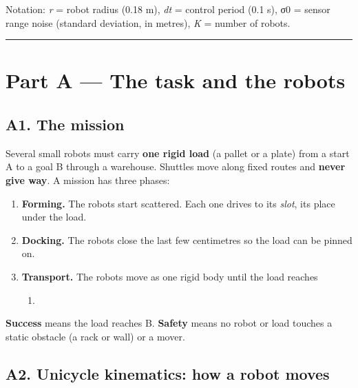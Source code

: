 \documentclass[
  10.5pt,
  a4paper,
]{article}
\providecommand{\tightlist}{%
  \setlength{\itemsep}{0pt}\setlength{\parskip}{0pt}}
\begin{document}
Notation: \emph{r} = robot radius (0.18 m), \emph{dt} = control period
(0.1 s), σ0 = sensor range noise (standard deviation, in metres),
\emph{K} = number of robots.

\begin{center}\rule{0.5\linewidth}{0.5pt}\end{center}

\hypertarget{part-a-the-task-and-the-robots}{%
\section{Part A --- The task and the
robots}\label{part-a-the-task-and-the-robots}}

\hypertarget{a1.-the-mission}{%
\subsection{A1. The mission}\label{a1.-the-mission}}

Several small robots must carry \textbf{one rigid load} (a pallet or a
plate) from a start A to a goal B through a warehouse. Shuttles move
along fixed routes and \textbf{never give way}. A mission has three
phases:

\begin{enumerate}
\def\labelenumi{\arabic{enumi}.}
\tightlist
\item
  \textbf{Forming.} The robots start scattered. Each one drives to its
  \emph{slot}, its place under the load.
\item
  \textbf{Docking.} The robots close the last few centimetres so the
  load can be pinned on.
\item
  \textbf{Transport.} The robots move as one rigid body until the load
  reaches

  \begin{enumerate}
  \def\labelenumii{\Alph{enumii}.}
  \setcounter{enumii}{1}
  \tightlist
  \item
  \end{enumerate}
\end{enumerate}

\textbf{Success} means the load reaches B. \textbf{Safety} means no
robot or load touches a static obstacle (a rack or wall) or a mover.

\hypertarget{a2.-unicycle-kinematics-how-a-robot-moves}{%
\subsection{A2. Unicycle kinematics: how a robot
moves}\label{a2.-unicycle-kinematics-how-a-robot-moves}}
\end{document}
